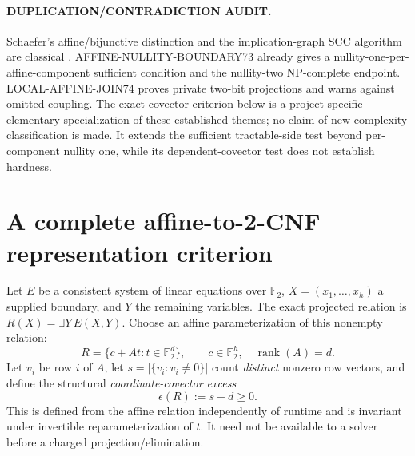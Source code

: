 \documentclass[11pt]{article}
\begin{document}
\paragraph{DUPLICATION/CONTRADICTION AUDIT.}
Schaefer's affine/bijunctive distinction and the implication-graph SCC
algorithm are classical \cite{schaefer,apt}. AFFINE-NULLITY-BOUNDARY73
already gives a nullity-one-per-affine-component sufficient condition and
the nullity-two NP-complete endpoint. LOCAL-AFFINE-JOIN74 proves private
two-bit projections and warns against omitted coupling. The exact covector
criterion below is a project-specific elementary specialization of these
established themes; no claim of new complexity classification is made.
It extends the sufficient tractable-side test beyond per-component
nullity one, while its dependent-covector test does not establish hardness.

\section{A complete affine-to-2-CNF representation criterion}
Let $E$ be a consistent system of linear equations over $\mathbb F_2$,
$X=(x_1,\ldots,x_h)$ a supplied boundary, and $Y$ the remaining variables.
The exact projected relation is $R(X)=\exists Y\,E(X,Y)$.
Choose an affine parameterization of this nonempty relation:
\[
R=\{c+At:t\in\mathbb F_2^d\},\qquad
c\in\mathbb F_2^h,\quad \operatorname{rank}(A)=d. \tag{2}
\]
Let $v_i$ be row $i$ of $A$, let
$s=|\{v_i:v_i\ne0\}|$ count \emph{distinct} nonzero row vectors, and
define the structural \emph{coordinate-covector excess}
\[
\epsilon(R):=s-d\ge0. \tag{3}
\]
This is defined from the affine relation independently of runtime and is
invariant under invertible reparameterization of $t$. It need not be
available to a solver before a charged projection/elimination.
\end{document}
